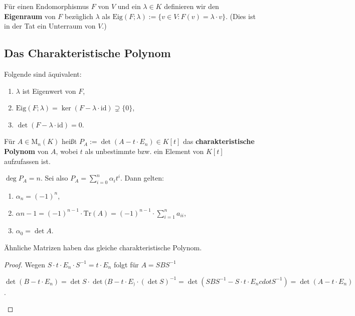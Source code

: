 \begin{definition} Für einen Endomorphismus $F$ von $V$ und ein $\lambda \in K$
definieren wir den \textbf{Eigenraum} von $F$ bezüglich $\lambda$ als
$\text{Eig}( F ; \lambda ) := \{ v \in V: F(v) = \lambda \cdot v \}$. (Dies ist
in der Tat ein Unterraum von $V$.)
\end{definition}

\subsection{Das Charakteristische Polynom}

\begin{bemerkung} Folgende sind äquivalent:
\begin{enumerate}[label=\roman*)]
\item $\lambda$ ist Eigenwert von $F$,
\item $\text{Eig}(F; \lambda) = \ker (F - \lambda \cdot \text{id}) \supsetneq
\{ 0 \}$,
\item $\det (F - \lambda \cdot \text {id}) = 0$.
\end{enumerate}
\end{bemerkung}

\begin{definition} Für $A \in \text{M}_n(K)$ heißt $P_A := \det (A - t \cdot
E_n) \in K[t]$ das \textbf{charakteristische Polynom} von $A$, wobei $t$ als
unbestimmte bzw. ein Element von $K[t]$ aufzufassen ist.
\end{definition}

\begin{bemerkung} $\deg P_A = n$. Sei also $P_A = \sum_{i=0}^n \alpha_i t^i $.
Dann gelten:
\begin{enumerate}[label = \roman*)]
\item $\alpha_n = (-1)^n$,
\item $\alpha{n-1} = (-1)^{n-1} \cdot \text{Tr}(A) = (-1)^{n-1} \cdot
\sum_{i=1}^n a_{ii}$,
\item $\alpha_0 = \det A$.
\end{enumerate}
\end{bemerkung}

\begin{lemma} Ähnliche Matrizen haben das gleiche charakteristische Polynom.
\end{lemma}
\begin{proof}
Wegen $S \cdot t \cdot E_n \cdot S^{-1} = t \cdot E_n $ folgt
für $A = S B S^{-1}$
\begin{center}
$\det (B - t \cdot E_n) = \det S \cdot \det (B - t \cdot E_) \cdot (\det S)^{-1}
= \det ( SBS^{-1} - S \cdot t \cdot E_n cdot S^{-1}) =\det ( A - t \cdot E_n)$.
\end{center}
\end{proof}

